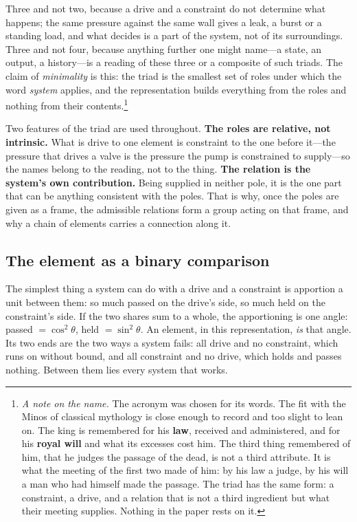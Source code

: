 \documentclass[11pt,a4paper]{article}
\theoremstyle{plain}
\theoremstyle{definition}
\theoremstyle{remark}
\begin{document}
Three and not two, because a drive and a constraint do not determine what happens; the same pressure against the same wall gives a leak, a burst or a standing load, and what decides is a part of the system, not of its surroundings. Three and not four, because anything further one might name---a state, an output, a history---is a reading of these three or a composite of such triads. The claim of \emph{minimality} is this: the triad is the smallest set of roles under which the word \emph{system} applies, and the representation builds everything from the roles and nothing from their contents.\footnote{\emph{A note on the name.} The acronym was chosen for its words. The fit with the Minos of classical mythology is close enough to record and too slight to lean on. The king is remembered for his \textbf{law}, received and administered, and for his \textbf{royal will} and what its excesses cost him. The third thing remembered of him, that he judges the passage of the dead, is not a third attribute. It is what the meeting of the first two made of him: by his law a judge, by his will a man who had himself made the passage. The triad has the same form: a constraint, a drive, and a relation that is not a third ingredient but what their meeting supplies. Nothing in the paper rests on it.}

Two features of the triad are used throughout. \textbf{The roles are relative, not intrinsic.} What is drive to one element is constraint to the one before it---the pressure that drives a valve is the pressure the pump is constrained to supply---so the names belong to the reading, not to the thing. \textbf{The relation is the system's own contribution.} Being supplied in neither pole, it is the one part that can be anything consistent with the poles. That is why, once the poles are given as a frame, the admissible relations form a group acting on that frame, and why a chain of elements carries a connection along it.

\subsection{The element as a binary comparison}\label{sec:comparison}

The simplest thing a system can do with a drive and a constraint is apportion a unit between them: so much passed on the drive's side, so much held on the constraint's side. If the two shares sum to a whole, the apportioning is one angle: passed $=\cos^2\theta$, held $=\sin^2\theta$. An element, in this representation, \emph{is} that angle. Its two ends are the two ways a system fails: all drive and no constraint, which runs on without bound, and all constraint and no drive, which holds and passes nothing. Between them lies every system that works.
\end{document}
